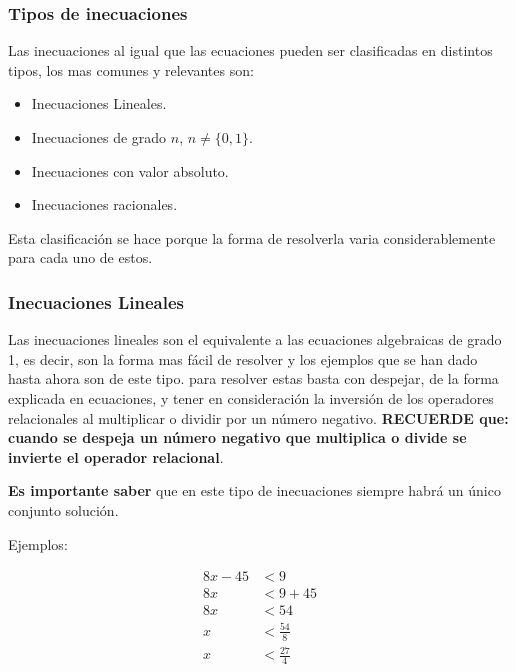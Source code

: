     \subsubsection{Tipos de inecuaciones} \label{Tipos-de-inecuaciones}

    Las inecuaciones al igual que las ecuaciones pueden ser clasificadas en
    distintos tipos, los mas comunes y relevantes son:

    \begin{itemize}
        \item Inecuaciones Lineales.
        \item Inecuaciones de grado $n$, $n \not = \{0,1\}$.
        \item Inecuaciones con valor absoluto.
        \item Inecuaciones racionales.
    \end{itemize}

    Esta clasificación se hace porque la forma de resolverla varia
    considerablemente para cada uno de estos.

    \subsubsection*{Inecuaciones Lineales} \label{Inecuaciones-Lineales}

    Las inecuaciones lineales son el equivalente a las ecuaciones algebraicas
    de grado 1, es decir, son la forma mas fácil de resolver y los ejemplos que
    se han dado hasta ahora son de este tipo. para resolver
    estas basta con despejar, de la forma explicada en \refname{ecuaciones},
    y tener en consideración la inversión de los operadores relacionales al
    multiplicar o dividir por un número negativo. \textbf{RECUERDE que:}
    \textbf{cuando se despeja un número negativo que multiplica
    o divide se invierte el operador relacional}.

    \textbf{Es importante saber } que en este tipo de inecuaciones siempre habrá
    un único conjunto solución.

    Ejemplos:

    \begin{align*}
        8x -45  &<9 		\\
        8x &< 9+45 \\
        8x & < 54\\
        x & < \frac{54}{8} \\
        x & < \frac{27}{4}
    \end{align*}

